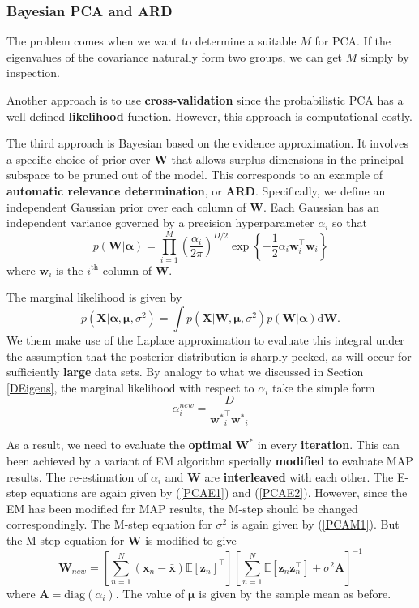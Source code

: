 \documentclass[a4paper]{report}
\newcommand{\ud}{\mathrm{d}}
\newcommand{\up}{\mathrm}
\renewcommand{\bf}{\mathbf}
\newcommand{\bb}{\mathbb}
\newcommand{\bs}{\boldsymbol}
\begin{document}
\subsubsection{Bayesian PCA and ARD}
The problem comes when we want to determine a suitable $M$ for PCA. If the eigenvalues of the covariance naturally form two groups, we can get $M$ simply by inspection. 

Another approach is to use \textbf{cross-validation} since the probabilistic PCA has a well-defined \textbf{likelihood} function. However, this approach is computational costly.

The third approach is Bayesian based on the evidence approximation. It involves a specific choice of prior over $\bf{W}$ that allows surplus dimensions in the principal subspace to be pruned out of the model. This corresponds to an example of \textbf{automatic relevance determination}, or \textbf{ARD}. Specifically, we define an independent Gaussian prior over each column of $\bf{W}$. Each Gaussian has an independent variance governed by a precision hyperparameter $\alpha_i$ so that
\begin{equation}
	p(\bf{W}|\bs{\alpha}) = \prod_{i=1}^M \left( \frac{\alpha_i}{2\pi} \right)^{D/2} \exp\left\{ -\frac{1}{2}\alpha_i \bf{w}_i^{\intercal} \bf{w}_i \right\}
\end{equation}
where $\bf{w}_i$ is the $i^{\up{th}}$ column of $\bf{W}$.

The marginal likelihood is given by
\begin{equation}
	p(\bf{X}|\bs{\alpha,\mu},\sigma^2) = \int p(\bf{X|W},\bs{\mu},\sigma^2) p(\bf{W}|\bs{\alpha}) \ud \bf{W}.
\end{equation}
We them make use of the Laplace approximation to evaluate this integral under the assumption that the posterior distribution is sharply peeked, as will occur for sufficiently \textbf{large} data sets. By analogy to what we discussed in Section \ref{DEigens}, the marginal likelihood with respect to $\alpha_i$ take the simple form
\begin{equation}
	\alpha_i^{new} = \frac{D}{\bf{w^*}_i^{\intercal} \bf{w^*}_i}
\end{equation}

As a result, we need to evaluate the \textbf{optimal} $\bf{W}^*$ in every \textbf{iteration}. This can been achieved by a variant of EM algorithm specially \textbf{modified} to evaluate MAP results. The re-estimation of $\alpha_i$ and $\bf{W}$ are \textbf{interleaved} with each other. The E-step equations are again given by (\ref{PCAE1}) and (\ref{PCAE2}). However, since the EM has been modified for MAP results, the M-step should be changed correspondingly. The M-step equation for $\sigma^2$ is again given by (\ref{PCAM1}). But the M-step equation for $\bf{W}$ is modified to give
\begin{equation}
	\bf{W}_{new} = \left[ \sum_{n=1}^N (\bf{x}_n-\bar{\bf{x}})\bb{E}[\bf{z}_n]^{\intercal} \right] \left[ \sum_{n=1}^N \bb{E}[\bf{z}_n\bf{z}_n^{\intercal}] +\sigma^2 \bf{A}\right]^{-1}
\end{equation}
where $\bf{A} = \up{diag}(\alpha_i)$. The value of $\bs{\mu}$ is given by the sample mean as before.
\end{document}

